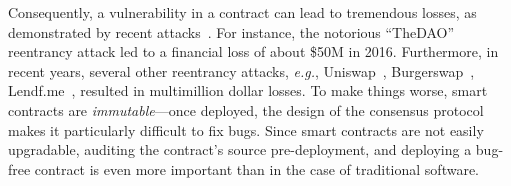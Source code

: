 \documentclass[conference, romanappendices]{tex/IEEEtran}
\theoremstyle{bfnote}
\newcommand{\smart}{smart contract}
\newcommand{\reentrancy}{{reentrancy}\xspace}
\newcommand{\eg}{\textit{e.g.}}
\begin{document}
Consequently, a vulnerability in a contract can lead to tremendous losses, as demonstrated by recent attacks~\cite{attack1,attack2,attack3,attack4}.
For instance, the notorious ``TheDAO''~\cite{dao-attack} \reentrancy attack led to a financial loss of about \${50M\EndAccSupp{}} in 2016.
Furthermore, in recent years, several other \reentrancy attacks, \eg,  Uniswap~\cite{uniswap-attack},  Burgerswap~\cite{burgerswap-attack}, Lendf.me~\cite{lendf-attack}, resulted in multimillion {dollar\EndAccSupp{}} losses.
To make things worse, smart contracts are \emph{immutable}---once deployed, the design of the {consensus\EndAccSupp{}} protocol makes it particularly difficult to fix bugs.
Since \smart s are not easily upgradable, {auditing\EndAccSupp{}} the contract's source pre-deployment, and deploying a bug-free contract is even more important than in the case of traditional software.
\end{document}
